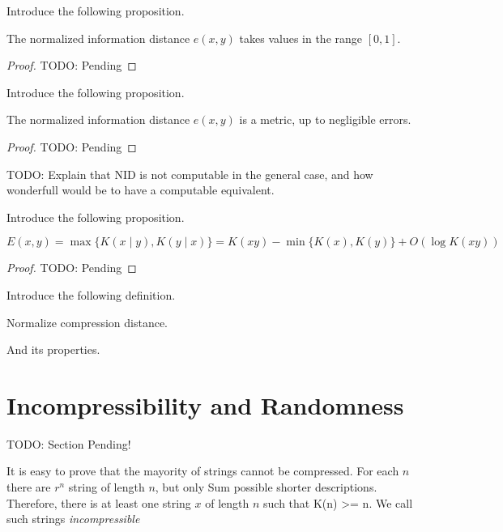 {\color{red} Introduce the following proposition.}

\begin{proposition}
The normalized information distance $e(x, y)$ takes values in the range $[0, 1]$.
\end{proposition}
\begin{proof}
{\color{red} TODO: Pending}
\end{proof}

{\color{red} Introduce the following proposition.}

\begin{proposition}
The normalized information distance $e(x, y)$ is a metric, up to negligible errors.
\end{proposition}
\begin{proof}
{\color{red} TODO: Pending}
\end{proof}

{\color{red} TODO: Explain that NID is not computable in the general case, and how wonderfull would be to have a computable equivalent.}

{\color{red} Introduce the following proposition.}

\begin{proposition}
\[
E(x, y) = \max\{ K(x \mid y), K(y \mid x) \} = K(xy) - \min\{ K(x), K(y) \} + O(\log K(xy) )
\]
\end{proposition}
\begin{proof}
{\color{red} TODO: Pending}
\end{proof}

{\color{red} Introduce the following definition.}

\begin{definition}
Normalize compression distance.
\end{definition}

{\color{red} And its properties.}


%
%

\section{Incompressibility and Randomness}
\label{sec:incompressibility_randomness}

{\color{red} TODO: Section Pending!}

It is easy to prove that the mayority of strings cannot be compressed. For each $n$ there are $r^n$ string of length $n$, but only Sum possible shorter descriptions. Therefore, there is at least one string $x$ of length $n$ such that K(n) >= n. We call such strings \emph{incompressible}

